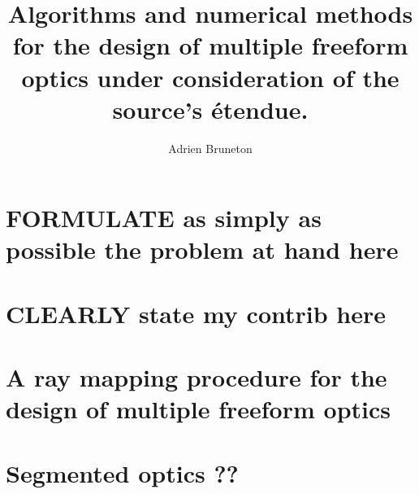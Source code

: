 \documentclass[10pt,a4paper,draft]{book}
\author{Adrien Bruneton}
\title{Algorithms and numerical methods for the design of multiple freeform optics
under consideration of the source's \'etendue.}
\numberwithin{equation}{section}
\numberwithin{figure}{section}
\begin{document}
\maketitle
\tableofcontents



\chapter{FORMULATE as simply as possible the problem at hand here}



\chapter{CLEARLY state my contrib here}

\chapter{A ray mapping procedure for the design of multiple freeform optics}
\label{ch:core}

%








% 
\chapter{Segmented optics ??}



%

\end{document}
